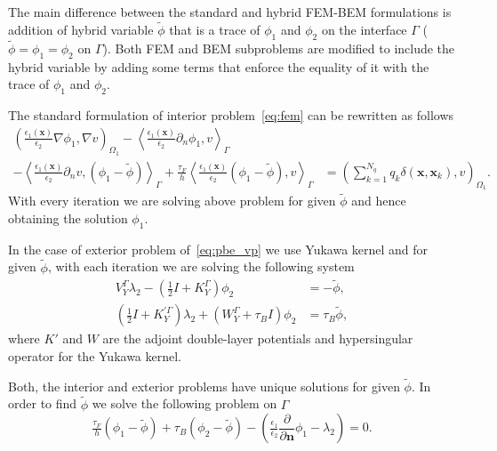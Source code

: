     The main difference between the standard and hybrid FEM-BEM formulations is addition of hybrid variable $\widetilde{\phi}$ that is a trace of $\phi_1$ and $\phi_2$ on the interface $\Gamma$ ($\widetilde{\phi} = \phi_1 = \phi_2$ on  $\Gamma$). Both FEM and BEM subproblems are modified to include the hybrid variable by adding some terms that enforce the equality of it with the trace of $\phi_1$ and $\phi_2$.
    
    The standard formulation of interior problem~\eqref{eq:fem} can be rewritten as follows
\begin{align*}
 \left(  \tfrac{\epsilon_1(\mathbf{x})}{\epsilon_2} \nabla \phi_1, \nabla v \right)_{\Omega_1} -  \left<  \tfrac{\epsilon_1(\mathbf{x})}{\epsilon_2}  \partial_n \phi_1, v \right>_\Gamma
  & \\
 -  \left<  \tfrac{\epsilon_1(\mathbf{x})}{\epsilon_2} \partial_n v, (\phi_1 - \widetilde{\phi}) \right>_\Gamma
  + \tfrac{\tau_F}{h} \left<  \tfrac{\epsilon_1(\mathbf{x})}{\epsilon_2} (\phi_1 - \widetilde{\phi}), v \right>_\Gamma & = \left(  \sum_{k=1}^{N_q} q_k\delta(\mathbf{x},\mathbf{x}_k),   v \right)_{\Omega_1}.
\end{align*}
With every iteration we are solving above problem for given $\widetilde{\phi}$ and hence obtaining the solution $ \phi_1$.

In the case of exterior problem of~\eqref{eq:pbe_vp} we use Yukawa kernel and 
for given $\widetilde{\phi}$, with each iteration we are solving the following system
\begin{align*}
V_{Y}^{\Gamma} \lambda_2  - \left( \tfrac{1}{2}I + K_{Y}^{\Gamma}  \right) \phi_2 &= - \widetilde{\phi},  \\
 \left( \tfrac{1}{2} I +  K_{Y}^{'\Gamma}\right)  \lambda_2 + \left(W_{Y}^{\Gamma} + \tau_B I\right)  \phi_2  &= \tau_B \widetilde{\phi},
\end{align*}
where $K'$ and $W$ are the adjoint double-layer potentials and hypersingular operator for the Yukawa kernel.

Both, the interior and exterior problems have unique solutions for given $\widetilde{\phi}$. In order to find $\widetilde{\phi}$ we solve the following problem on $\Gamma$
\begin{equation*}
\tfrac{\tau_F}{h} \left( \phi_1 - \widetilde{\phi}\right) + \tau_B \left( \phi_2 - \widetilde{\phi}\right)  - \left(\tfrac{\epsilon_1}{\epsilon_2} \frac{\partial}{\partial \mathbf{n}} \phi_1 -\lambda_2 \right)  = 0.
\end{equation*}

